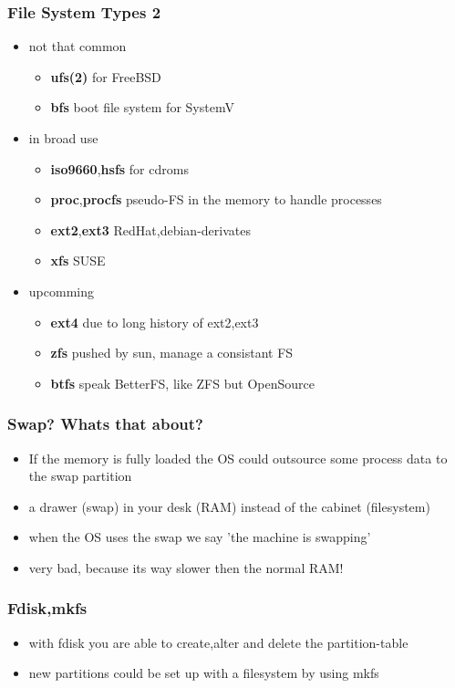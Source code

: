 \documentclass[hyperref={pdfpagelabels=false}]{beamer}
\begin{document}
        \begin{frame}
			\frametitle{File System Types 2}
            \begin{itemize}
                \item<1-> not that common
                \begin{itemize}
                    \item<1-> \textbf{ufs(2)} for FreeBSD
                    \item<1-> \textbf{bfs} boot file system for SystemV
                \end{itemize}
                \item<2-> in broad use
                \begin{itemize}
                    \item<2-> \textbf{iso9660},\textbf{hsfs} for cdroms
                    \item<2-> \textbf{proc},\textbf{procfs} pseudo-FS in the memory to handle processes 
                    \item<2-> \textbf{ext2},\textbf{ext3} RedHat,debian-derivates
                    \item<2-> \textbf{xfs} SUSE 
                \end{itemize}
                \item<3-> upcomming
                \begin{itemize}
                    \item<3-> \textbf{ext4} due to long history of ext2,ext3
                    \item<3-> \textbf{zfs} pushed by sun, manage a consistant FS
                    \item<3-> \textbf{btfs} speak BetterFS, like ZFS but OpenSource
                \end{itemize}                
            \end{itemize}
		\end{frame}
    	\begin{frame}
			\frametitle{Swap? Whats that about?}
			\begin{itemize}
                \item<1-> If the memory is fully loaded the OS could outsource some process data to the swap partition
                \item<1-> a drawer (swap) in your desk (RAM) instead of the cabinet (filesystem)
                \item<2-> when the OS uses the swap we say 'the machine is swapping'
                \item<2-> very bad, because its way slower then the normal RAM!
            \end{itemize}
		\end{frame}
    	\begin{frame}
			\frametitle{Fdisk,mkfs}
			\begin{itemize}
                \item<1-> with fdisk you are able to create,alter and delete the partition-table
                \item<1-> new partitions could be set up with a filesystem by using mkfs
            \end{itemize}
		\end{frame}
\end{document}
